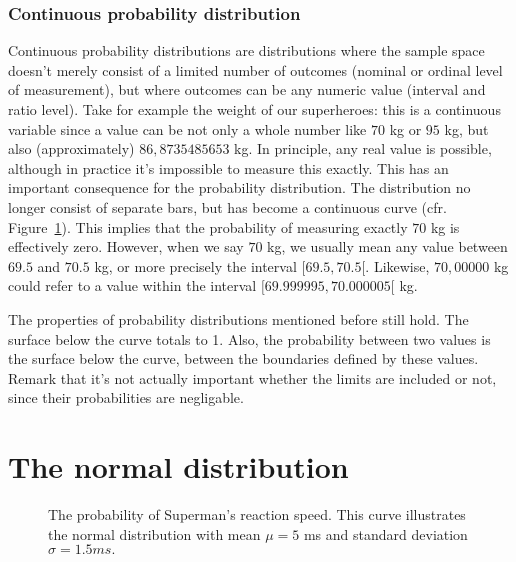 \subsubsection{Continuous probability distribution}

Continuous probability distributions are distributions where the sample space doesn't merely consist of a limited number of outcomes (nominal or ordinal level of measurement), but where outcomes can be any numeric value (interval and ratio level).
Take for example the weight of our superheroes: this is a continuous variable since a value can be not only a whole number like $70$ kg or $95$ kg, but also (approximately) $86,8735485653$ kg. In principle, any real value is possible, although in practice it's impossible to measure this exactly. This has an important consequence for the probability distribution. The distribution no longer consist of separate bars, but has become a continuous curve (cfr. Figure~\ref{fig:verdelingReactievermogen}). This implies that the probability of measuring exactly $70$ kg is effectively zero. However, when we say $70$ kg, we usually mean any value between $69.5$ and $70.5$ kg, or more precisely the interval $[69.5, 70.5[$. Likewise, $70,00000$ kg could refer to a value within the interval $[69.999995, 70.000005[$ kg.

The properties of probability distributions mentioned before still hold. The surface below the curve totals to 1. Also, the probability between two values is the surface below the curve, between the boundaries defined by these values. Remark that it's not actually important whether the limits are included or not, since their probabilities are negligable.

\section{The normal distribution}
\label{sec:normal-distribution}

\begin{figure}[t]
\centering
{}
\caption{The probability of Superman's reaction speed. This curve illustrates the normal distribution with mean $\mu = 5$ ms and standard deviation $\sigma = 1.5 ms.$}
\label{fig:verdelingReactievermogen}
\end{figure}


